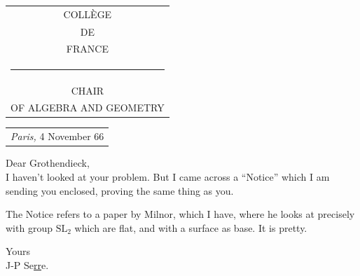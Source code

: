 \noindent\begin{tabular}[t]{c}
COLLÈGE\\
DE\\
FRANCE\\
\rule{1.8em}{0.5pt}\\
CHAIR\\
OF ALGEBRA AND GEOMETRY
\end{tabular}\hfill
\begin{tabular}[t]{l}
\textit{Paris,} 4 November 66\\
\end{tabular}

Dear Grothendieck,\\

I haven’t looked at your problem. But I came across a ``Notice'' which I am sending you enclosed, proving the same thing as you.

The Notice refers to a paper by Milnor, which I have, where he looks at precisely  with group $\mathrm{SL}_{2}$ which are flat, and with a surface as base. It is  pretty.

Yours\\
J-P Se\uline{rr}e.\\
\clearpage
